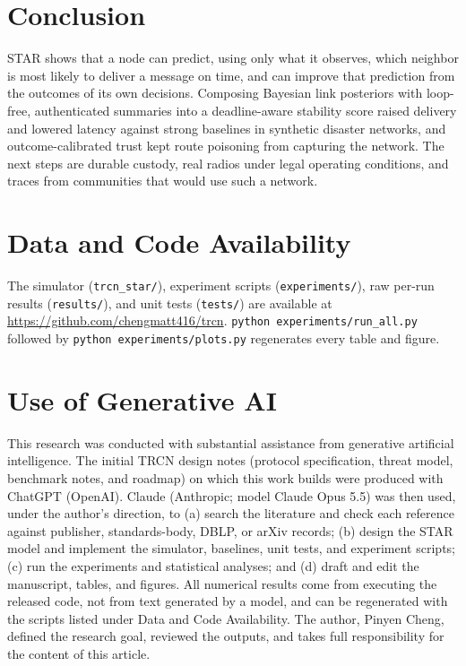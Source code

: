 \documentclass[jou,a4paper,11pt,floatsintext]{apa7}
\begin{document}
\section{Conclusion}

STAR shows that a node can predict, using only what it observes, which neighbor is most likely to deliver a message on time, and can improve that prediction from the outcomes of its own decisions. Composing Bayesian link posteriors with loop-free, authenticated summaries into a deadline-aware stability score raised delivery and lowered latency against strong baselines in synthetic disaster networks, and outcome-calibrated trust kept route poisoning from capturing the network. The next steps are durable custody, real radios under legal operating conditions, and traces from communities that would use such a network.

\section*{Data and Code Availability}
The simulator (\texttt{trcn\_star/}), experiment scripts (\texttt{experiments/}), raw per-run results (\texttt{results/}), and unit tests (\texttt{tests/}) are available at \url{https://github.com/chengmatt416/trcn}. \texttt{python experiments/run\_all.py} followed by \texttt{python experiments/plots.py} regenerates every table and figure.

\section*{Use of Generative AI}
This research was conducted with substantial assistance from generative artificial intelligence. The initial TRCN design notes (protocol specification, threat model, benchmark notes, and roadmap) on which this work builds were produced with ChatGPT (OpenAI). Claude (Anthropic; model Claude Opus 5.5) was then used, under the author's direction, to (a) search the literature and check each reference against publisher, standards-body, DBLP, or arXiv records; (b) design the STAR model and implement the simulator, baselines, unit tests, and experiment scripts; (c) run the experiments and statistical analyses; and (d) draft and edit the manuscript, tables, and figures. All numerical results come from executing the released code, not from text generated by a model, and can be regenerated with the scripts listed under Data and Code Availability. The author, Pinyen Cheng, defined the research goal, reviewed the outputs, and takes full responsibility for the content of this article.
\end{document}
